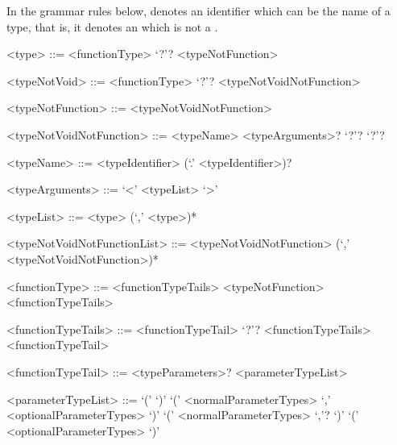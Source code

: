 \documentclass[makeidx]{article}
\begin{document}
{%
\LMHash{}%
In the grammar rules below,  denotes an identifier which can be
the name of a type, that is, it denotes an  which is not a
.



\begin{grammar}

<type> ::= <functionType> `?'?
  \alt <typeNotFunction>

<typeNotVoid> ::= <functionType> `?'?
  \alt <typeNotVoidNotFunction>

<typeNotFunction> ::= \VOID{}
  \alt <typeNotVoidNotFunction>

<typeNotVoidNotFunction> ::= <typeName> <typeArguments>? `?'?
  \alt \FUNCTION{} `?'?

<typeName> ::= <typeIdentifier> (`.' <typeIdentifier>)?

<typeArguments> ::= `<' <typeList> `>'

<typeList> ::= <type> (`,' <type>)*

<typeNotVoidNotFunctionList> ::= \gnewline{}
  <typeNotVoidNotFunction> (`,' <typeNotVoidNotFunction>)*

<functionType> ::= <functionTypeTails>
  \alt <typeNotFunction> <functionTypeTails>

<functionTypeTails> ::= <functionTypeTail> `?'? <functionTypeTails>
  \alt <functionTypeTail>

<functionTypeTail> ::= \FUNCTION{} <typeParameters>? <parameterTypeList>

<parameterTypeList> ::= `(' `)'
  \alt `(' <normalParameterTypes> `,' <optionalParameterTypes> `)'
  \alt `(' <normalParameterTypes> `,'? `)'
  \alt `(' <optionalParameterTypes> `)'


\end{grammar}}
\end{document}
